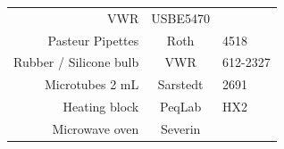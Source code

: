 \documentclass[11pt,singlespacinge,twoside]{reedthesis} %
\theoremstyle{definition}
\theoremstyle{definition}
\theoremstyle{definition}
\theoremstyle{remark}
\begin{document}
\begin{longtable}[]{@{}rcl@{}}
\begin{minipage}[t]{0.26\columnwidth}
VWR\strut
\end{minipage} & \begin{minipage}[t]{0.16\columnwidth}\raggedright
USBE5470\strut
\end{minipage}\tabularnewline
\begin{minipage}[t]{0.50\columnwidth}\raggedleft
Pasteur Pipettes\strut
\end{minipage} & \begin{minipage}[t]{0.26\columnwidth}\centering
Roth\strut
\end{minipage} & \begin{minipage}[t]{0.16\columnwidth}\raggedright
4518\strut
\end{minipage}\tabularnewline
\begin{minipage}[t]{0.50\columnwidth}\raggedleft
Rubber / Silicone bulb\strut
\end{minipage} & \begin{minipage}[t]{0.26\columnwidth}\centering
VWR\strut
\end{minipage} & \begin{minipage}[t]{0.16\columnwidth}\raggedright
612-2327\strut
\end{minipage}\tabularnewline
\begin{minipage}[t]{0.50\columnwidth}\raggedleft
Microtubes 2 mL\strut
\end{minipage} & \begin{minipage}[t]{0.26\columnwidth}\centering
Sarstedt\strut
\end{minipage} & \begin{minipage}[t]{0.16\columnwidth}\raggedright
2691\strut
\end{minipage}\tabularnewline
\begin{minipage}[t]{0.50\columnwidth}\raggedleft
Heating block\strut
\end{minipage} & \begin{minipage}[t]{0.26\columnwidth}\centering
PeqLab\strut
\end{minipage} & \begin{minipage}[t]{0.16\columnwidth}\raggedright
HX2\strut
\end{minipage}\tabularnewline
\begin{minipage}[t]{0.50\columnwidth}\raggedleft
Microwave oven\strut
\end{minipage} & \begin{minipage}[t]{0.26\columnwidth}\centering
Severin\strut
\end{minipage} & \begin{minipage}[t]{0.16\columnwidth}\raggedright

\end{minipage}
\end{longtable}
\end{document}
